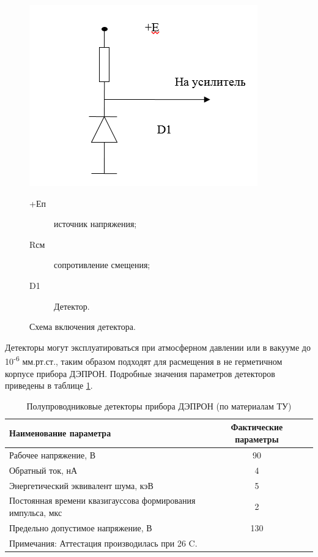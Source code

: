 \begin{figure}[h]
	\centering
	\includegraphics[width=0.5\linewidth]{images/detector_sch}
	\caption{Схема включения детектора.}
	\medskip
	\small
	\begin{description}
		\item[+Еп] источник напряжения;
		\item[Rсм] сопротивление смещения;
		\item[D1] Детектор.
	\end{description}			
	\label{fig:detector_sch}
\end{figure}
	


Детекторы могут эксплуатироваться при атмосферном давлении или в вакууме до 10\textsuperscript{-6} мм.рт.ст., таким образом подходят для расмещения в не герметичном корпусе прибора ДЭПРОН. Подробные значения параметров детекторов приведены в таблице \ref{tab:detectors}.

\begin{table} 

	\begin{tabular}{p{10cm}|cc}
		Наименование параметра&Фактические параметры\\ \hline
		Рабочее напряжение, В&90&\\ Обратный ток, нА&4\\
		Энергетический эквивалент шума, кэВ&5\\
		Постоянная времени квазигауссова формирования импульса, мкс&2\\
		Предельно допустимое напряжение, В&130\\
		\multicolumn{2}{l}{Примечания: Аттестация производилась при 26 C.}\\
		
	\end{tabular} 
	\caption{Полупроводниковые детекторы прибора ДЭПРОН (по материалам ТУ)}
		\label{tab:detectors}
\end{table}



